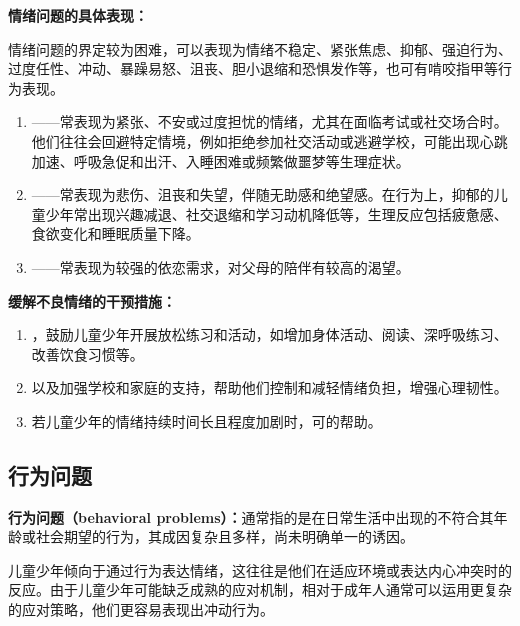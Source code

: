 \begin{defbox}
\textbf{情绪问题的具体表现：}

情绪问题的界定较为困难，可以表现为情绪不稳定、紧张焦虑、抑郁、强迫行为、过度任性、冲动、暴躁易怒、沮丧、胆小退缩和恐惧发作等，也可有啃咬指甲等行为表现。

\begin{enumerate}[leftmargin=*]
    \item {}——常表现为紧张、不安或过度担忧的情绪，尤其在面临考试或社交场合时。他们往往会回避特定情境，例如拒绝参加社交活动或逃避学校，可能出现心跳加速、呼吸急促和出汗、入睡困难或频繁做噩梦等生理症状。

    \item {}——常表现为悲伤、沮丧和失望，伴随无助感和绝望感。在行为上，抑郁的儿童少年常出现兴趣减退、社交退缩和学习动机降低等，生理反应包括疲惫感、食欲变化和睡眠质量下降。

    \item {}——常表现为较强的依恋需求，对父母的陪伴有较高的渴望。
\end{enumerate}
\end{defbox}

\begin{tipbox}
\textbf{缓解不良情绪的干预措施：}

\begin{enumerate}[leftmargin=*]
    \item {}，鼓励儿童少年开展放松练习和活动，如增加身体活动、阅读、深呼吸练习、改善饮食习惯等。
    \item {}以及加强学校和家庭的支持，帮助他们控制和减轻情绪负担，增强心理韧性。
    \item 若儿童少年的情绪持续时间长且程度加剧时，可的帮助。
\end{enumerate}
\end{tipbox}

\subsection{行为问题}

\begin{defbox}
\textbf{行为问题（behavioral problems）：}通常指的是在日常生活中出现的不符合其年龄或社会期望的行为，其成因复杂且多样，尚未明确单一的诱因。

儿童少年倾向于通过行为表达情绪，这往往是他们在适应环境或表达内心冲突时的反应。由于儿童少年可能缺乏成熟的应对机制，相对于成年人通常可以运用更复杂的应对策略，他们更容易表现出冲动行为。
\end{defbox}

